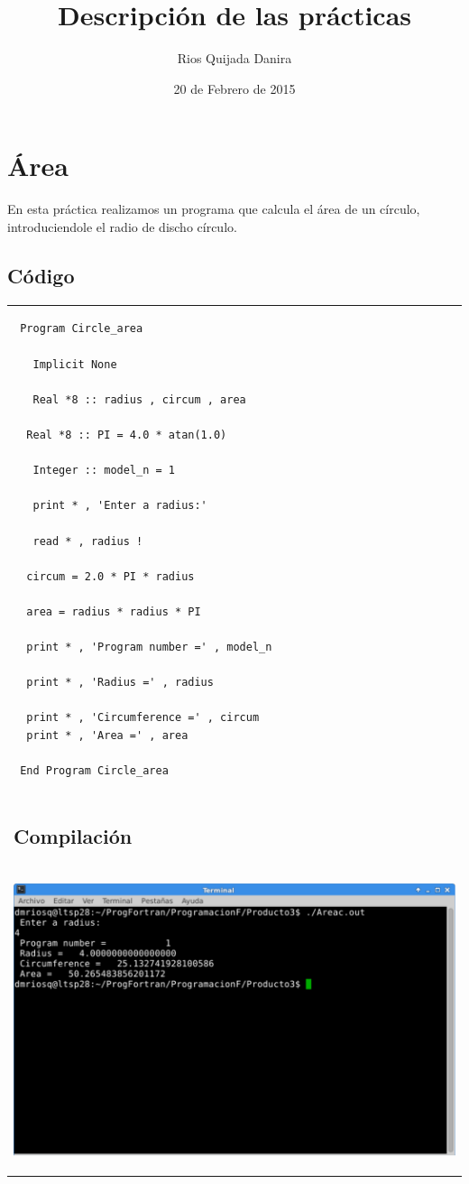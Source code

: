 \documentclass[10pt]{article}
\title{Descripción de las prácticas}
\author{Rios Quijada Danira}
\date{20 de Febrero de 2015}
\begin{document}
\maketitle
\section{Área}
En esta práctica realizamos un programa que calcula el área de un círculo, introduciendole el radio de discho círculo.

\subsection{Código}
\begin{tabular}{l}
\begin{verbatim}  
 Program Circle_area 

   Implicit None 

   Real *8 :: radius , circum , area 

  Real *8 :: PI = 4.0 * atan(1.0) 

   Integer :: model_n = 1 

   print * , 'Enter a radius:' 

   read * , radius !

  circum = 2.0 * PI * radius 

  area = radius * radius * PI 

  print * , 'Program number =' , model_n 

  print * , 'Radius =' , radius 

  print * , 'Circumference =' , circum 
  print * , 'Area =' , area 

 End Program Circle_area
\end{verbatim} \\

\subsection{Compilación}\\

\begin{center}
   \includegraphics[scale=0.4]{A}
\end{center}
\end{tabular}
\end{document}
